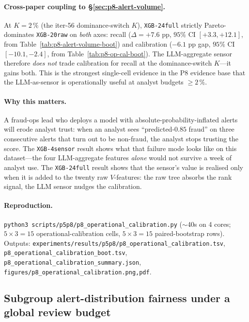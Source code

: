 \documentclass{article}
\begin{document}
\paragraph{Cross-paper coupling to \S\ref{sec:p8-alert-volume}.}
At $K{=}2\,\%$ (the iter-56 dominance-switch $K$), \texttt{XGB-24full}
strictly Pareto-dominates \texttt{XGB-20raw} on \emph{both} axes: recall
($\Delta = +7.6$ pp, $95\%$ CI $[+3.3, +12.1]$, from
Table~\ref{tab:p8-alert-volume-boot}) and calibration ($-6.1$ pp gap,
$95\%$ CI $[-10.1, -2.4]$, from
Table~\ref{tab:p8-op-cal-boot}). The LLM-aggregate sensor therefore
\emph{does not} trade calibration for recall at the dominance-switch
$K$---it gains both. This is the strongest single-cell evidence in the
P8 evidence base that the LLM-as-sensor is operationally useful at
analyst budgets $\ge 2\,\%$.

\paragraph{Why this matters.}
A fraud-ops lead who deploys a model with absolute-probability-inflated
alerts will erode analyst trust: when an analyst sees
``predicted-$0.85$ fraud'' on three consecutive alerts that turn out to
be non-fraud, the analyst stops trusting the score. The
\texttt{XGB-4sensor} result shows what that failure mode looks like on
this dataset---the four LLM-aggregate features \emph{alone} would not
survive a week of analyst use. The \texttt{XGB-24full} result shows
that the sensor's value is realised only when it is added to the twenty
raw $V$-features: the raw tree absorbs the rank signal, the LLM sensor
nudges the calibration.

\paragraph{Reproduction.}
\texttt{python3 scripts/p5p8/p8\_operational\_calibration.py} ($\sim$40s
on 4 cores; $5 \times 3 = 15$ operational-calibration cells, $5 \times
3 = 15$ paired-bootstrap rows). Outputs:
\texttt{experiments/results/p5p8/p8\_operational\_calibration.tsv},
\texttt{p8\_operational\_calibration\_boot.tsv},
\texttt{p8\_operational\_calibration\_summary.json},
\texttt{figures/p8\_operational\_calibration.{png,pdf}}.

\subsection{Subgroup alert-distribution fairness under a global review budget}
\label{sec:p8-subgroup-fairness}
\end{document}
